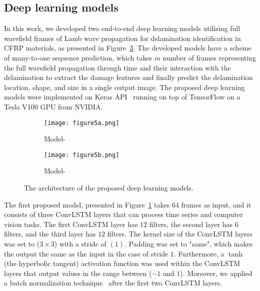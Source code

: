 \subsection{Deep learning models}
\label{proposed_approach}
In this work, we developed two end-to-end deep learning models utilising full 
wavefield frames of Lamb wave propagation for delamination identification in 
CFRP materials, as presented in Figure~\ref{fig:proposed_models}.
The developed models have a scheme of many-to-one sequence prediction, which takes \(m\) number of frames representing the full wavefield propagation through time and their interaction with the delamination to extract the damage features and finally predict the delamination location, shape, and size in a single output image.
The proposed deep learning models were implemented on Keras API~\cite{chollet2015keras} running on top of TensorFlow on a Tesla V100 GPU from NVIDIA.
\begin{figure} [!h]
	\centering
	\begin{subfigure}[b]{0.49\textwidth}
		\centering
		\texttt{[image: figure5a.png]}
		\caption{\centering Model-} %
		\label{fig:convlstm_model}
	\end{subfigure}
	\hfill
	\begin{subfigure}[b]{0.49\textwidth}
		\centering
		\texttt{[image: figure5b.png]}
		\caption{\centering Model-} %
		\label{fig:AE_convlstm}
	\end{subfigure}
	\caption{The architecture of the proposed deep learning models.}
	\label{fig:proposed_models}
\end{figure} 

The first proposed model, presented in Figure~\ref{fig:convlstm_model} takes 
\(64\) frames as input, and it consists of three ConvLSTM layers that can 
process time series and computer vision tasks.
The first ConvLSTM layer has \(12\) filters, the second layer has \(6\) filters, and the third layer has \(12\) filters.
The kernel size of the ConvLSTM layers was set to (\(3\times3\)) with a stride of \((1)\). 
Padding was set to "same", which makes the output the same as the input in the case of stride \(1\).
Furthermore, a \(\tanh\) (the hyperbolic tangent) activation function was used within the ConvLSTM layers that output values in the range between (\(-1\) and \(1\)).
Moreover, we applied a batch normalization technique~\cite{Santurkar2018} after the first two ConvLSTM layers.

